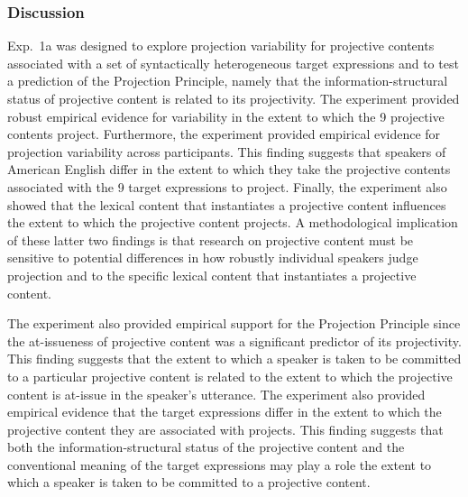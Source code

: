 \documentclass[11pt,fleqn]{article}
\newcommand{\6}{\mbox{$[\hspace*{-.6mm}[$}}
\newcommand{\9}{\mbox{$]\hspace*{-.6mm}]$}}
\newcommand{\jd}[1]{\textbf{\color{Green}[jd: #1]}}
\begin{document}
%
%
%
%
%
%


\subsubsection{Discussion}\label{s-discussion1a}

Exp.~1a was designed to explore projection variability for projective contents associated with a set of syntactically heterogeneous target expressions and to test a prediction of the Projection Principle, namely that the information-structural status of projective content is related to its projectivity. The experiment provided robust empirical evidence for variability in the extent to which the 9 projective contents project. Furthermore, the experiment provided empirical evidence for projection variability across participants. This finding suggests that speakers of American English differ in the extent to which they take the projective contents associated with the 9 target expressions to project. Finally, the experiment also showed that the lexical content that instantiates a projective content influences the extent to which the projective content projects. A methodological implication of these latter two findings is that research on projective content must be sensitive to potential differences in how robustly individual speakers judge projection and to the specific lexical content that instantiates a projective content.

The experiment also provided empirical support for the Projection Principle since the at-issueness of projective content was a significant predictor of its projectivity. This finding suggests that the extent to which a speaker is taken to be committed to a particular projective content is related to the extent to which the projective content is at-issue in the speaker's utterance. The experiment also provided empirical evidence that the target expressions differ in the extent to which the projective content they are associated with projects. This finding suggests that both the information-structural status of the projective content and the conventional meaning of the target expressions may play a role the extent to which a speaker is taken to be committed to a projective content.
\end{document}

